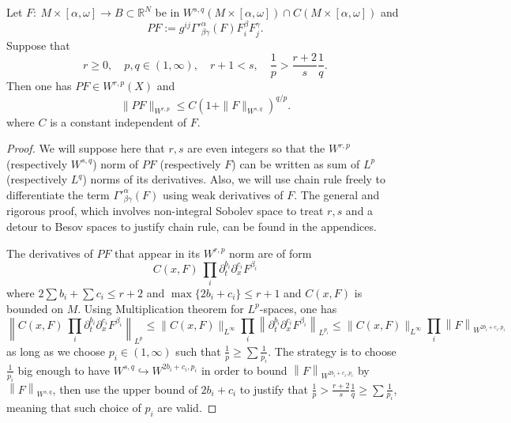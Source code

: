 \begin{theorem}
\label{thm:reg-quad}
Let \(F:\ M\times [\alpha,\omega] \longrightarrow B\subset \mathbb{R}^N\) be in \(W^{s,q}(M\times[\alpha,\omega])\cap C(M\times [\alpha,\omega])\) and
\[ 
P F := g^{ij}\Gamma'^\alpha_{\beta\gamma}(F) F^\beta_i
F^\gamma_j.
\]
Suppose that
\begin{equation}
\label{eq:cond:thm:reg-poly-diff}
 r\geq 0,\quad p,q\in (1,\infty),\quad r+1 < s, \quad \frac{1}{p}> \frac{r+2}{s} \frac{1}{q}.
\end{equation}
Then one has \(PF\in W^{r,p}(X)\) and
\[
 \|P F \|_{W^{r,p}} \leq C\left(1 + \|F\|_{W^{s,q}}\right)^{q/p}.
\]
where \(C\) is a constant independent of \(F\).
\end{theorem}

\begin{proof}
We will suppose here that \(r,s\) are even integers so that the \(W^{r,p}\)
(respectively \(W^{s,q}\)) norm of \(PF\) (respectively \(F\)) can be written as sum of \(L^p\)
(respectively \(L^q\)) norms of its derivatives. Also, we will use chain rule freely to
differentiate the term \(\Gamma'^\alpha_{\beta\gamma}(F)\) using weak derivatives of \(F\). The general and rigorous proof, which involves non-integral Sobolev space to treat \(r, s\) and a detour to Besov spaces to justify chain rule, can be found in the appendices.

The derivatives of \(PF\) that appear in its \(W^{r,p}\) norm are of form
\[
 C(x,F)\ \prod_i \partial_t^{b_i} \partial_x^{c_i} F^{\beta_i} 
\]
where \(2\sum b_i + \sum c_i \leq r+2\) and \(\max \{2b_i+ c_i\}\leq r+1\) and \(C(x,F)\) is bounded on \(M\). Using Multiplication theorem for \(L^p\)-spaces, one has
\[
  \left\|C(x,F)\ \prod_i \partial_t^{b_i} \partial_x^{c_i} F^{\beta_i} \right\|_{L^p} \leq
\|C(x,F)\|_{L^\infty} \prod_i \left\|\partial_t^{b_i} \partial_x^{c_i}
F^{\beta_i}\right\|_{L^{p_i}}  \leq \|C(x,F)\|_{L^\infty} \prod_i \left\|F\right\|_{W^{2b_i+c_i,p_i}}
\]
as long as we choose \(p_i\in (1,\infty)\) such that \(\frac{1}{p} \geq \sum
\frac{1}{p_i}\). The
strategy is to choose \(\frac{1}{p_i}\) big enough to have \(W^{s,q}
\hookrightarrow W^{2b_i+c_i,p_i}\) in order to
bound \(\left\|F\right\|_{W^{2b_i+c_i,p_i}}\) by \(\left\|F\right\|_{W^{s,q}}\), then
use the upper bound of \(2b_i +c_i\) to justify that \(\frac{1}{p} > \frac{r+2}{s}
\frac{1}{q} \geq \sum \frac{1}{p_i}\), meaning that such choice of \(p_i\) are valid.


\end{proof}
